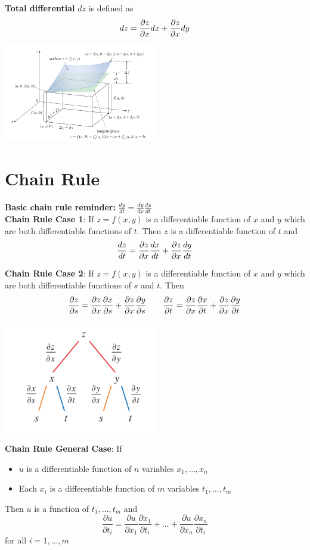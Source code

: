 \documentclass{report}
\begin{document}
\textbf{Total differential} $dz$ is defined as
\[
dz = \frac{\partial z}{\partial x} dx + \frac{\partial z}{\partial x} dy
\]

\begin{center}
    \includegraphics[width=0.5\textwidth]{images/differential.png}
\end{center}

\section{Chain Rule}

\textbf{Basic chain rule reminder:} $\frac{dy}{dt} = \frac{dy}{dx} \frac{dx}{dt}$
\\

\textbf{Chain Rule Case 1}: If $z = f(x, y)$ is a differentiable function of $x$ and $y$ which are 
both differentiable functions of $t$. Then $z$ is a differentiable function of $t$ and 
\[
\frac{dz}{dt} = \frac{\partial z}{\partial x} \frac{dx}{dt} + \frac{\partial z}{\partial x} \frac{dy}{dt}
\]

\textbf{Chain Rule Case 2}: If $z = f(x, y)$ is a differentiable function of $x$ and $y$ which are 
both differentiable functions of $s$ and $t$. Then 
\[
\frac{\partial z}{\partial s} = \frac{\partial z}{\partial x} \frac{\partial x}{\partial s} + \frac{\partial z}{\partial x} \frac{\partial y}{\partial s} \quad \quad \frac{\partial z}{\partial t} = \frac{\partial z}{\partial x} \frac{\partial x}{\partial t} + \frac{\partial z}{\partial x} \frac{\partial y}{\partial t}
\]

\begin{center}
    \includegraphics[width=0.5\textwidth]{images/chain.png}
\end{center}

\textbf{Chain Rule General Case}: If 
\begin{itemize}
    \item $u$ is a differentiable function of $n$ variables $x_1, \dots, x_n$
    \item Each $x_i$ is a differentiable function of $m$ variables $t_1, \dots, t_m$
\end{itemize}
Then $u$ is a function of $t_1, \dots, t_m$ and 
\[
\frac{\partial u}{\partial t_i} = \frac{\partial u}{\partial x_1} \frac{\partial x_1}{\partial t_i} + \dots + \frac{\partial u}{\partial x_n} \frac{\partial x_n}{\partial t_i}
\]
for all $i = 1, \dots, m$
\\
\end{document}
